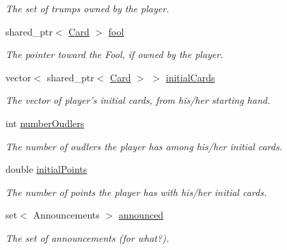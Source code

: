 \begin{DoxyCompactItemize}
\begin{DoxyCompactList}\small\item\em \-The set of trumps owned by the player. \end{DoxyCompactList}\item 
\hypertarget{classPlayer_a9dfead246bd18b99398c89777290a162}{shared\-\_\-ptr$<$ \hyperlink{classCard}{\-Card} $>$ \hyperlink{classPlayer_a9dfead246bd18b99398c89777290a162}{fool}}\label{classPlayer_a9dfead246bd18b99398c89777290a162}

\begin{DoxyCompactList}\small\item\em \-The pointer toward the \-Fool, if owned by the player. \end{DoxyCompactList}\item 
\hypertarget{classPlayer_aac0d154d58a07310ee23c3c763f2cfa9}{vector$<$ shared\-\_\-ptr$<$ \hyperlink{classCard}{\-Card} $>$ $>$ \hyperlink{classPlayer_aac0d154d58a07310ee23c3c763f2cfa9}{initial\-Cards}}\label{classPlayer_aac0d154d58a07310ee23c3c763f2cfa9}

\begin{DoxyCompactList}\small\item\em \-The vector of player's initial cards, from his/her starting hand. \end{DoxyCompactList}\item 
\hypertarget{classPlayer_a9f218c1ff377eaeb7a336156410f7386}{int \hyperlink{classPlayer_a9f218c1ff377eaeb7a336156410f7386}{number\-Oudlers}}\label{classPlayer_a9f218c1ff377eaeb7a336156410f7386}

\begin{DoxyCompactList}\small\item\em \-The number of oudlers the player has among his/her initial cards. \end{DoxyCompactList}\item 
\hypertarget{classPlayer_af625acf7f8ad267630c7e3bd50d2683b}{double \hyperlink{classPlayer_af625acf7f8ad267630c7e3bd50d2683b}{initial\-Points}}\label{classPlayer_af625acf7f8ad267630c7e3bd50d2683b}

\begin{DoxyCompactList}\small\item\em \-The number of points the player has with his/her initial cards. \end{DoxyCompactList}\item 
\hypertarget{classPlayer_a90efe0cf8930297c7d30805d19763b65}{set$<$ \-Announcements $>$ \hyperlink{classPlayer_a90efe0cf8930297c7d30805d19763b65}{announced}}\label{classPlayer_a90efe0cf8930297c7d30805d19763b65}

\begin{DoxyCompactList}\small\item\em \-The set of announcements (for what?). \end{DoxyCompactList}\end{DoxyCompactItemize}
